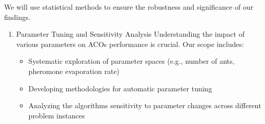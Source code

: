 \documentclass[
]{article}
\begin{document}
We will use statistical methods to ensure the robustness and
significance of our findings.

\begin{enumerate}
\def\labelenumi{\arabic{enumi}.}
\setcounter{enumi}{4}
\item
  Parameter Tuning and Sensitivity Analysis Understanding the impact of
  various parameters on ACO\textquotesingle s performance is crucial.
  Our scope includes:

  \begin{itemize}
  \item
    Systematic exploration of parameter spaces (e.g., number of ants,
    pheromone evaporation rate)
  \item
    Developing methodologies for automatic parameter tuning
  \item
    Analyzing the algorithm\textquotesingle s sensitivity to parameter
    changes across different problem instances
  \end{itemize}
\end{enumerate}
\end{document}
